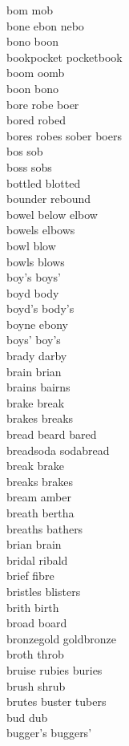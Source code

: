 bom mob\\
bone ebon nebo\\
bono boon\\
bookpocket pocketbook\\
boom oomb\\
boon bono\\
bore robe boer\\
bored robed\\
bores robes sober boers\\
bos sob\\
boss sobs\\
bottled blotted\\
bounder rebound\\
bowel below elbow\\
bowels elbows\\
bowl blow\\
bowls blows\\
boy's boys'\\
boyd body\\
boyd's body's\\
boyne ebony\\
boys' boy's\\
brady darby\\
brain brian\\
brains bairns\\
brake break\\
brakes breaks\\
bread beard bared\\
breadsoda sodabread\\
break brake\\
breaks brakes\\
bream amber\\
breath bertha\\
breaths bathers\\
brian brain\\
bridal ribald\\
brief fibre\\
bristles blisters\\
brith birth\\
broad board\\
bronzegold goldbronze\\
broth throb\\
bruise rubies buries\\
brush shrub\\
brutes buster tubers\\
bud dub\\
bugger's buggers'\\
